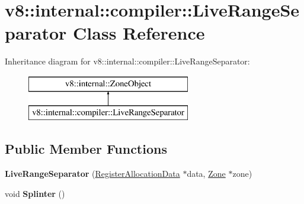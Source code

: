 \hypertarget{classv8_1_1internal_1_1compiler_1_1_live_range_separator}{}\section{v8\+:\+:internal\+:\+:compiler\+:\+:Live\+Range\+Separator Class Reference}
\label{classv8_1_1internal_1_1compiler_1_1_live_range_separator}
Inheritance diagram for v8\+:\+:internal\+:\+:compiler\+:\+:Live\+Range\+Separator\+:\begin{figure}[H]
\begin{center}
\leavevmode
\includegraphics[height=2.000000cm]{classv8_1_1internal_1_1compiler_1_1_live_range_separator}
\end{center}
\end{figure}
\subsection*{Public Member Functions}
\begin{DoxyCompactItemize}
\item 
{\bfseries Live\+Range\+Separator} (\hyperlink{classv8_1_1internal_1_1compiler_1_1_register_allocation_data}{Register\+Allocation\+Data} $\ast$data, \hyperlink{classv8_1_1internal_1_1_zone}{Zone} $\ast$zone)\hypertarget{classv8_1_1internal_1_1compiler_1_1_live_range_separator_a140d2e4341e2ff0aa774459164943b6c}{}\label{classv8_1_1internal_1_1compiler_1_1_live_range_separator_a140d2e4341e2ff0aa774459164943b6c}

\item 
void {\bfseries Splinter} ()\hypertarget{classv8_1_1internal_1_1compiler_1_1_live_range_separator_a4ffdf3b613bbda7370f15a3fd5139f1a}{}\label{classv8_1_1internal_1_1compiler_1_1_live_range_separator_a4ffdf3b613bbda7370f15a3fd5139f1a}

\end{DoxyCompactItemize}
